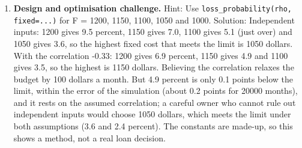 \documentclass[11pt,a4paper]{article}
\begin{document}
\begin{enumerate}[nosep]
\item \textbf{Design and optimisation challenge.} Hint: Use \texttt{loss\_probability(rho, fixed=...)} for F = 1200, 1150, 1100, 1050 and 1000. Solution: Independent inputs: 1200 gives 9.5 percent, 1150 gives 7.0, 1100 gives 5.1 (just over) and 1050 gives 3.6, so the highest fixed cost that meets the limit is 1050 dollars. With the correlation -0.33: 1200 gives 6.9 percent, 1150 gives 4.9 and 1100 gives 3.5, so the highest is 1150 dollars. Believing the correlation relaxes the budget by 100 dollars a month. But 4.9 percent is only 0.1 points below the limit, within the error of the simulation (about 0.2 points for 20000 months), and it rests on the assumed correlation; a careful owner who cannot rule out independent inputs would choose 1050 dollars, which meets the limit under both assumptions (3.6 and 2.4 percent). The constants are made-up, so this shows a method, not a real loan decision.
\end{enumerate}
\end{document}
